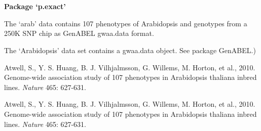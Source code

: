 \documentclass[a4paper]{book}
\begin{document}
\chapter*{}
\begin{center}
{\textbf{\huge Package `p.exact'}}
\par\bigskip{\large \today}
\end{center}
\begin{description}
\raggedright{}
\item[Type]
\item[Title]
\item[Version]
\item[Date]
\item[Author]
\item[Maintainer]\AsIs{}
\item[Description]
\item[Depends]
\item[License]
\item[LazyLoad]
\end{description}
%
\begin{Description}\relax
The `arab' data contains 107 phenotypes of Arabidopsis and genotypes from a 250K SNP chip as GenABEL gwaa.data format. 
\end{Description}
%
\begin{Format}
 The `Arabidopsis' data set contains a gwaa.data object. See package GenABEL.)
\end{Format}
%
\begin{Source}\relax
Atwell, S., Y. S. Huang, B. J. Vilhjalmsson, G. Willems, M. Horton, et al., 2010. Genome-wide association study of 107 phenotypes in Arabidopsis thaliana inbred lines. \emph{Nature} 465: 627-631.
\end{Source}
%
\begin{References}\relax
Atwell, S., Y. S. Huang, B. J. Vilhjalmsson, G. Willems, M. Horton, et al., 2010. Genome-wide association study of 107 phenotypes in Arabidopsis thaliana inbred lines. \emph{Nature} 465: 627-631.
\end{References}
\end{document}
